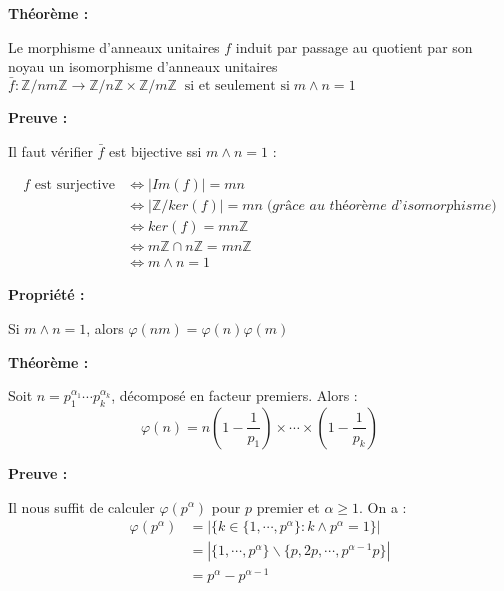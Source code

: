 \documentclass{report}
\newenvironment{preuve}{\begin{tcolorbox}[colframe= white]
    \textbf{Preuve :}
\par }
    {\end{tcolorbox}}
\newenvironment{prop}{\begin{tcolorbox}[colframe= white]
    \textbf{Propriété :}
     \par}
    {\end{tcolorbox}}
\newenvironment{theoreme}[1][]{
    \begin{tcolorbox}[]
    \textbf{Théorème :} #1  \par} 
    {\end{tcolorbox}}
\begin{document}
\begin{theoreme}
	Le morphisme d'anneaux unitaires $f$ induit par passage au quotient par son noyau un isomorphisme d'anneaux unitaires 
	$\bar{f} : \mathbb{Z}/nm\mathbb{Z} \rightarrow \mathbb{Z}/n\mathbb{Z} \times \mathbb{Z}/m\mathbb{Z}\; \; \text{si et seulement si}\; m\wedge n =1$
\end{theoreme}

\begin{preuve}
	Il faut vérifier $\bar{f}$ est bijective ssi $m \wedge n=1$ : \par
	\begin{equation*} 
	\begin{split}
		f \text{ est surjective}  & \iff | Im(f) | =mn \\
 		& \iff |\mathbb{Z}/ker(f)| = mn \; \textit{(grâce au théorème d'isomorphisme)} \\ 
		& \iff ker(f)= mn\mathbb{Z} \\ 
		& \iff m\mathbb{Z} \cap n\mathbb{Z} = mn\mathbb{Z} \\
		& \iff m \wedge n =1
	\end{split}
\end{equation*}
\end{preuve}

\begin{prop}
	Si $m \wedge n =1$, alors $\varphi (nm) = \varphi (n) \varphi (m)$
\end{prop}

\begin{theoreme}
	Soit $n=p_1^{\alpha_1} \cdots p_k^{\alpha_k}$, décomposé en facteur premiers. Alors : $$\varphi (n) = n \left (1-\frac{1}{p_1} \right )\times \cdots  \times \left (1-\frac{1}{p_k} \right ) $$
\end{theoreme}

\begin{preuve}
Il nous suffit de calculer $\varphi (p^\alpha)$ pour $p$ premier et $\alpha \geq 1$. On a : 
\begin{equation*} \label{eq1}
	\begin{split}
	\varphi (p^\alpha) & = | \{ k \in \{1, \cdots , p^\alpha \} : k \wedge p^\alpha =1 \}|  \\
	& = | \{ 1, \cdots , p^\alpha \} \backslash \{ p, 2p, \cdots , p^{\alpha -1}p \} | \\
	& =p^{\alpha}-p^{\alpha -1}
	\end{split}
\end{equation*}
\end{preuve}
\end{document}
